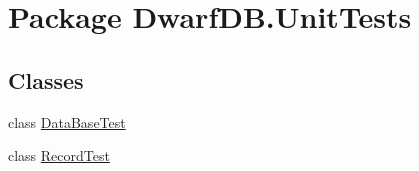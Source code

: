 \hypertarget{namespace_dwarf_d_b_1_1_unit_tests}{
\section{Package DwarfDB.UnitTests}
\label{namespace_dwarf_d_b_1_1_unit_tests}
}
\subsection*{Classes}
\begin{DoxyCompactItemize}
\item 
class \hyperlink{class_dwarf_d_b_1_1_unit_tests_1_1_data_base_test}{DataBaseTest}
\item 
class \hyperlink{class_dwarf_d_b_1_1_unit_tests_1_1_record_test}{RecordTest}
\end{DoxyCompactItemize}
